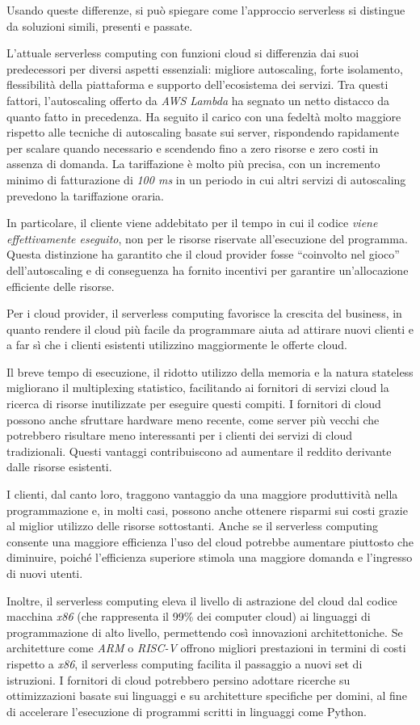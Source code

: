 Usando queste differenze, si può spiegare come l'approccio serverless si distingue da soluzioni simili, presenti e passate.

L'attuale serverless computing con funzioni cloud si differenzia dai suoi predecessori per diversi aspetti essenziali: migliore autoscaling, forte isolamento, flessibilità della piattaforma e supporto dell'ecosistema dei servizi. Tra questi fattori, l'autoscaling offerto da \textit{AWS Lambda} ha segnato un netto distacco da quanto fatto in precedenza. Ha seguito il carico con una fedeltà molto maggiore rispetto alle tecniche di autoscaling basate sui server, rispondendo rapidamente per scalare quando necessario e scendendo fino a zero risorse e zero costi in assenza di domanda. La tariffazione è molto più precisa, con un incremento minimo di fatturazione di \textit{100 ms} in un periodo in cui altri servizi di autoscaling prevedono la tariffazione oraria.

In particolare, il cliente viene addebitato per il tempo in cui il codice \textit{viene effettivamente eseguito}, non per le risorse riservate all'esecuzione del programma. Questa distinzione ha garantito che il cloud provider fosse “coinvolto nel gioco” dell'autoscaling e di conseguenza ha fornito incentivi per garantire un'allocazione efficiente delle risorse.

Per i cloud provider, il serverless computing favorisce la crescita del business, in quanto rendere il cloud più facile da programmare aiuta ad attirare nuovi clienti e a far sì che i clienti esistenti utilizzino maggiormente le offerte cloud.

Il breve tempo di esecuzione, il ridotto utilizzo della memoria e la natura stateless migliorano il multiplexing statistico, facilitando ai fornitori di servizi cloud la ricerca di risorse inutilizzate per eseguire questi compiti. I fornitori di cloud possono anche sfruttare hardware meno recente, come server più vecchi che potrebbero risultare meno interessanti per i clienti dei servizi di cloud tradizionali. Questi vantaggi contribuiscono ad aumentare il reddito derivante dalle risorse esistenti.

I clienti, dal canto loro, traggono vantaggio da una maggiore produttività nella programmazione e, in molti casi, possono anche ottenere risparmi sui costi grazie al miglior utilizzo delle risorse sottostanti. Anche se il serverless computing consente una maggiore efficienza l'uso del cloud potrebbe aumentare piuttosto che diminuire, poiché l'efficienza superiore stimola una maggiore domanda e l'ingresso di nuovi utenti.

Inoltre, il serverless computing eleva il livello di astrazione del cloud dal codice macchina \textit{x86} (che rappresenta il 99\% dei computer cloud) ai linguaggi di programmazione di alto livello, permettendo così innovazioni architettoniche. Se architetture come \textit{ARM} o \textit{RISC-V} offrono migliori prestazioni in termini di costi rispetto a \textit{x86}, il serverless computing facilita il passaggio a nuovi set di istruzioni. I fornitori di cloud potrebbero persino adottare ricerche su ottimizzazioni basate sui linguaggi e su architetture specifiche per domini, al fine di accelerare l'esecuzione di programmi scritti in linguaggi come Python.